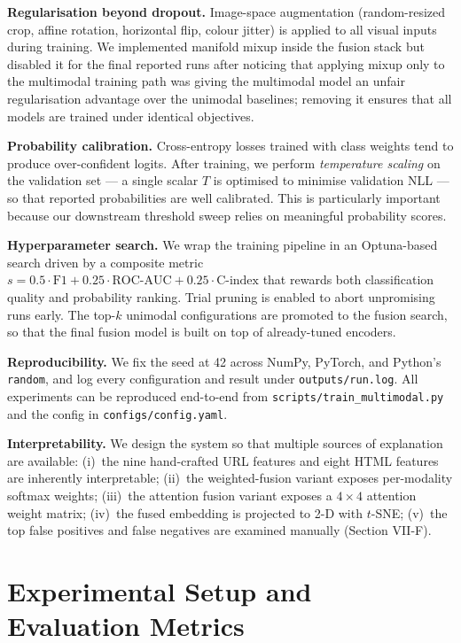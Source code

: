 \documentclass[conference]{IEEEtran}
\begin{document}
\noindent\textbf{Regularisation beyond dropout.} Image-space
augmentation (random-resized crop, affine rotation, horizontal flip,
colour jitter) is applied to all visual inputs during training.
We implemented manifold mixup inside the fusion stack but disabled
it for the final reported runs after noticing that applying mixup
only to the multimodal training path was giving the multimodal
model an unfair regularisation advantage over the unimodal
baselines; removing it ensures that all models are trained under
identical objectives.

\noindent\textbf{Probability calibration.} Cross-entropy losses
trained with class weights tend to produce over-confident logits.
After training, we perform \emph{temperature scaling} on the
validation set --- a single scalar $T$ is optimised to minimise
validation NLL --- so that reported probabilities are well
calibrated. This is particularly important because our downstream
threshold sweep relies on meaningful probability scores.

\noindent\textbf{Hyperparameter search.} We wrap the training
pipeline in an Optuna-based search driven by a composite metric
$s = 0.5\cdot\text{F1} + 0.25\cdot\text{ROC-AUC} +
0.25\cdot\text{C-index}$ that rewards both classification quality
and probability ranking. Trial pruning is enabled to abort
unpromising runs early. The top-$k$ unimodal configurations are
promoted to the fusion search, so that the final fusion model is
built on top of already-tuned encoders.

\noindent\textbf{Reproducibility.} We fix the seed at 42 across
NumPy, PyTorch, and Python's \texttt{random}, and log every
configuration and result under \texttt{outputs/run.log}. All
experiments can be reproduced end-to-end from
\texttt{scripts/train\_multimodal.py} and the config in
\texttt{configs/config.yaml}.

\noindent\textbf{Interpretability.} We design the system so that
multiple sources of explanation are available: (i)~the nine
hand-crafted URL features and eight HTML features are inherently
interpretable; (ii)~the weighted-fusion variant exposes per-modality
softmax weights; (iii)~the attention fusion variant exposes a
$4\times 4$ attention weight matrix; (iv)~the fused embedding is
projected to 2-D with $t$-SNE; (v)~the top false positives and
false negatives are examined manually (Section VII-F).

\section{Experimental Setup and Evaluation Metrics}
\end{document}
